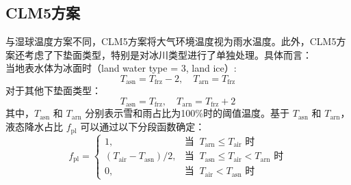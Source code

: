 \subsection{CLM5方案}
与湿球温度方案不同，CLM5方案将大气环境温度视为雨水温度。此外，CLM5方案还考虑了下垫面类型，特别是对冰川类型进行了单独处理。具体而言：\\
当地表水体为冰面时（land water type = 3, land ice）:
\begin{equation}
  T_{\mathrm{asn}} = T_{\mathrm{frz}} - 2,\quad T_{\mathrm{arn}} = T_{\mathrm{frz}}
\end{equation}
对于其他下垫面类型：
\begin{equation}
  T_{\mathrm{asn}} = T_{\mathrm{frz}},\quad T_{\mathrm{arn}} = T_{\mathrm{frz}} +2
\end{equation}
其中，$T_{\mathrm{asn}}$ 和 $T_{\mathrm{arn}}$ 分别表示雪和雨占比为100\%时的阈值温度。基于 $T_{\mathrm{asn}}$ 和 $T_{\mathrm{arn}}$，液态降水占比 $f_{\mathrm{pl}}$ 可以通过以下分段函数确定：
\begin{equation*}
  f_{\mathrm{pl}}= \begin{cases}
    1, & \text{当 }\ T_{\mathrm{arn}}\leqslant T_{\mathrm {air}} \text{ 时}\\
    (T_{\mathrm {air}} - T_{\mathrm{asn}})/2, & \text{当 }\  T_{\mathrm{asn}}\leqslant T_{\mathrm {air}} < T_{\mathrm{arn}} \text{ 时} \\
    0, & \text{当 }\ T_{\mathrm {air}} < T_{\mathrm{asn}} \text{ 时}
  \end{cases}
\end{equation*}



